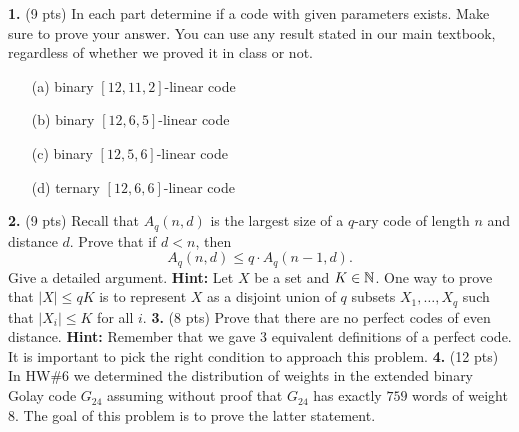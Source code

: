 \documentclass[12pt]{amsart}
\begin{document}
\skv
{\bf 1.} (9 pts) In each part determine if a code with given parameters exists. Make sure to prove your answer. You can use any result stated in our main textbook, regardless of whether we proved it in class or not.
\begin{itemize}
\item[(a)] binary $[12,11,2]$-linear code
\item[(b)] binary $[12,6,5]$-linear code
\item[(c)] binary $[12,5,6]$-linear code
\item[(d)] ternary $[12,6,6]$-linear code
\end{itemize}
\skv
{\bf 2.} (9 pts) Recall that $A_q(n,d)$ is the largest size of a $q$-ary code of length $n$ and distance $d$. Prove that if $d<n$,
then $$A_q(n,d)\leq q\cdot A_q(n-1,d).$$
Give a detailed argument.
{\bf Hint:} Let $X$ be a set and $K\in{\mathbb N}$. One way to prove that $|X|\leq qK$ is to represent $X$ as a disjoint union of
$q$ subsets $X_1,\ldots, X_q$ such that $|X_i|\leq K$ for all $i$.
\skv
{\bf 3.} (8 pts) Prove that there are no perfect codes of even distance. {\bf Hint:} Remember that we gave 3 equivalent definitions of a perfect code. It is important to pick the right condition to approach this problem.
\skv
{\bf 4.} (12 pts) In HW\#6 we determined the distribution of weights in the extended binary Golay code $G_{24}$ assuming without proof that $G_{24}$
has exactly $759$ words of weight $8$. The goal of this problem is to prove the latter statement.
\end{document}
